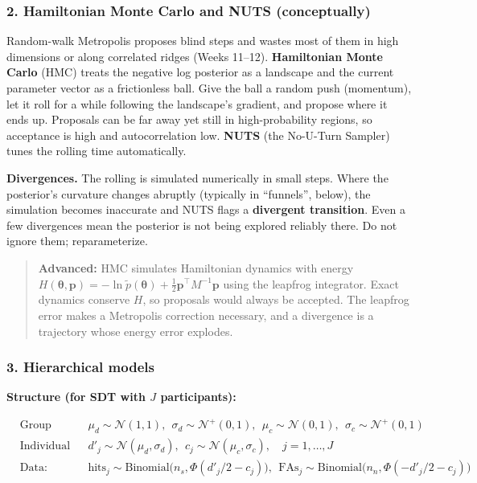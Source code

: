 \subsubsection{2. Hamiltonian Monte Carlo and NUTS (conceptually)}

Random-walk Metropolis proposes blind steps and wastes most of them in
high dimensions or along correlated ridges (Weeks 11--12).
\textbf{Hamiltonian Monte Carlo} (HMC) treats the negative log posterior
as a landscape and the current parameter vector as a frictionless ball.
Give the ball a random push (momentum), let it roll for a while
following the landscape's gradient, and propose where it ends up.
Proposals can be far away yet still in high-probability regions, so
acceptance is high and autocorrelation low. \textbf{NUTS} (the No-U-Turn
Sampler) tunes the rolling time automatically.

\textbf{Divergences.} The rolling is simulated numerically in small
steps. Where the posterior's curvature changes abruptly (typically in
``funnels'', below), the simulation becomes inaccurate and NUTS flags a
\textbf{divergent transition}. Even a few divergences mean the posterior
is not being explored reliably there. Do not ignore them;
reparameterize.

\begin{quote}
\textbf{Advanced:} HMC simulates Hamiltonian dynamics with energy
\(H(\boldsymbol\theta, \mathbf{p}) = -\ln\tilde p(\boldsymbol\theta) + \tfrac12\mathbf{p}^\top M^{-1}\mathbf{p}\)
using the leapfrog integrator. Exact dynamics conserve \(H\), so
proposals would always be accepted. The leapfrog error makes a
Metropolis correction necessary, and a divergence is a trajectory whose
energy error explodes.
\end{quote}

\subsubsection{3. Hierarchical models}

\textbf{Structure (for SDT with \(J\) participants):}

\[
\begin{aligned}
&\text{Group level:} && \mu_d \sim \mathcal{N}(1, 1),\ \ \sigma_d \sim \mathcal{N}^{+}(0, 1),\ \ \mu_c \sim \mathcal{N}(0, 1),\ \ \sigma_c \sim \mathcal{N}^{+}(0, 1)\\
&\text{Individual level:} && d'_j \sim \mathcal{N}(\mu_d, \sigma_d),\ \ c_j \sim \mathcal{N}(\mu_c, \sigma_c), \quad j = 1, \dots, J\\
&\text{Data:} && \text{hits}_j \sim \mathrm{Binomial}\big(n_s, \Phi(d'_j/2 - c_j)\big),\ \ \text{FAs}_j \sim \mathrm{Binomial}\big(n_n, \Phi(-d'_j/2 - c_j)\big)
\end{aligned}
\]

